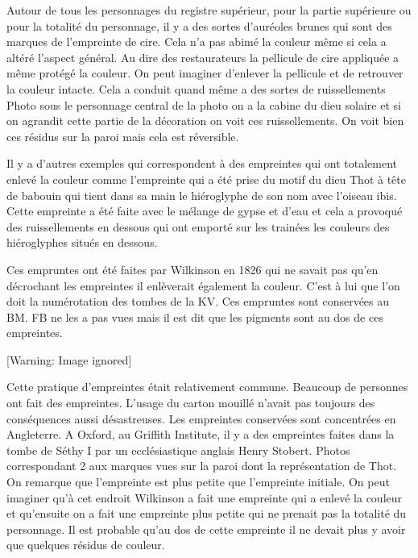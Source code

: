 \documentclass{article}
\begin{document}
Autour de tous les personnages du registre supérieur, pour la partie
supérieure ou pour la totalité du personnage,  il y a des sortes
d’auréoles brunes qui sont des marques de l’empreinte de cire. Cela n’a
pas abimé la couleur même si cela a altéré l’aspect général. Au dire
des restaurateurs la pellicule de cire appliquée a même protégé la
couleur. On peut imaginer d’enlever la pellicule et de retrouver la
couleur intacte. Cela a conduit quand même a des sortes de
ruissellements  Photo  sous le personnage central de la photo on a la
cabine du dieu solaire et si on agrandit cette partie de la décoration
on voit ces ruissellements. On voit bien ces résidus sur la paroi mais
cela est réversible. 

 Il y a d’autres exemples qui correspondent à des empreintes qui ont
totalement enlevé la couleur comme l’empreinte qui a été prise du motif
du dieu Thot à tête de babouin qui tient dans sa main le hiéroglyphe de
son nom avec l’oiseau ibis. Cette empreinte a été faite avec le mélange
de gypse et d’eau et cela a provoqué des ruissellements en dessous qui
ont emporté sur les trainées les couleurs des hiéroglyphes situés en
dessous. 

Ces empruntes ont été faites par Wilkinson en 1826 qui ne savait pas
qu’en décrochant les empreintes il enlèverait également la couleur.
C’est à lui que l’on doit la numérotation des tombes de la KV. Ces
empruntes sont conservées au BM. FB ne les a pas vues mais il est dit
que les pigments sont au dos de ces empreintes.

  [Warning: Image ignored] %
 

Cette pratique d’empreintes était relativement commune. Beaucoup de
personnes ont fait des empreintes. L’usage du carton mouillé n’avait
pas toujours des conséquences aussi désastreuses. Les empreintes
conservées sont concentrées  en Angleterre. A Oxford, au Griffith
Institute,  il y a des empreintes faites dans la tombe de Séthy I par
un ecclésiastique anglais Henry Stobert. Photos correspondant 2 aux
marques vues sur la paroi dont la représentation de Thot. On remarque
que l’empreinte est plus petite que l’empreinte initiale.  On peut
imaginer qu’à cet endroit Wilkinson a fait une empreinte qui a enlevé
la couleur et qu’ensuite on a fait une empreinte plus petite qui ne
prenait pas la totalité du personnage. Il est probable qu’au dos de
cette empreinte il ne devait plus y avoir que quelques résidus de
couleur. 
\end{document}
